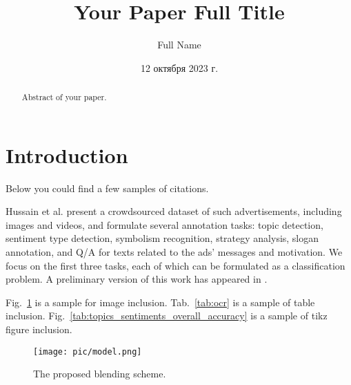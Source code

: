 \documentclass{zapiski}
\date{12 октября 2023 г.}
\begin{document}
\title[Your Paper Short Title]{Your Paper Full Title}


\author[Author]{Full Name}
\address[F.~Name]{Address}

\begin{abstract}
Abstract of your paper.
\end{abstract}


\maketitle

\section{Introduction}\label{sec:intro}

Below you could find a few samples of citations.

Hussain et al. \cite{hussain2017automatic} present a crowdsourced dataset of such advertisements,
including images and videos, and formulate several annotation tasks: topic detection,
sentiment type detection, symbolism recognition, strategy analysis, slogan annotation,
and Q/A for texts related to the ads' messages and motivation. We focus on the first three tasks,
each of which can be formulated as a classification problem.
A preliminary version of this work has appeared in \cite{savchenko2020ad}.

Fig.~\ref{fig:model} is a sample for image inclusion. Tab.~\ref{tab:ocr} is a sample of table inclusion.
Fig.~\ref{tab:topics_sentiments_overall_accuracy} is a sample of tikz figure inclusion.

\begin{figure}[!tbh]
    \centering
    \texttt{[image: pic/model.png]}
    \vspace{-.5cm}
    \caption{The proposed blending scheme.}
    \label{fig:model}\vspace{-.3cm}
\end{figure}
\end{document}
